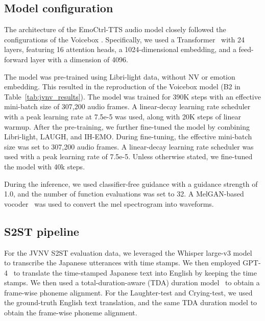 \vspace{-.5em}
\subsection{Model configuration}
\vspace{-.5em}

The architecture of the EmoCtrl-TTS audio model closely followed the configurations of the Voicebox \cite{le2024voicebox}. Specifically, we used a Transformer~\cite{vaswani2017attention} with 24 layers, featuring 16 attention heads, a 1024-dimensional embedding, and a feed-forward layer with a dimension of 4096.

The model was pre-trained using Libri-light data, without NV or emotion embedding. This resulted in the reproduction of the Voicebox model (B2 in Table~\ref{tab:jvnv_results}). The model was trained for 390K steps with an effective mini-batch size of 307,200 audio frames.
A linear-decay learning rate scheduler with a peak learning rate at 7.5e-5 was used, along with 20K steps of linear warmup.
After the pre-training, we further fine-tuned the model by combining Libri-light, LAUGH, and IH-EMO.
During fine-tuning, 
the effective mini-batch size was set to 307,200 audio frames. 
A linear-decay learning rate scheduler was used with a peak learning rate of 7.5e-5.
Unless otherwise stated, we fine-tuned the model with 40k steps.

During the inference, we used classifier-free guidance with a guidance strength of 1.0, and the number of function evaluations was set to 32. 
A MelGAN-based vocoder~\cite{kumar2019melgan} was used to convert the mel spectrogram into waveforms.

\vspace{-.5em}
\subsection{S2ST pipeline} 
\vspace{-.5em}

For the JVNV S2ST evaluation data, we leveraged the Whisper large-v3 model~\cite{radford2023robust} to transcribe the Japanese utterances with time stamps. We then employed GPT-4~\cite{achiam2023gpt} to translate the time-stamped Japanese text into English by keeping the time stamps.
We then used a total-duration-aware (TDA) duration model~\cite{eskimez2024total} to obtain a frame-wise phoneme alignment.
For the Laughter-test and Crying-test, we used the ground-truth English text translation,
and the same TDA duration model
to obtain the frame-wise phoneme alignment.

